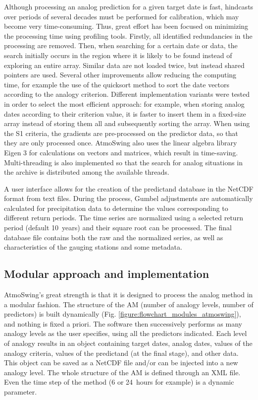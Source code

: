 \documentclass[gmd]{copernicus}
\begin{document}
Although processing an analog prediction for a given target date is fast, hindcasts over periods of several decades must be performed for calibration, which may become very time-consuming. Thus, great effort has been focused on minimizing the processing time using profiling tools. Firstly, all identified redundancies in the processing are removed. Then, when searching for a certain date or data, the search initially occurs in the region where it is likely to be found instead of exploring an entire array. Similar data are not loaded twice, but instead shared pointers are used. Several other improvements allow reducing the computing time, for example the use of the quicksort method \citep{Hoare1962a} to sort the date vectors according to the analogy criterion. Different implementation variants were tested in order to select the most efficient approach: for example, when storing analog dates according to their criterion value, it is faster to insert them in a fixed-size array instead of storing them all and subsequently sorting the array. When using the S1 criteria, the gradients are pre-processed on the predictor data, so that they are only processed once. AtmoSwing also uses the linear algebra library Eigen 3 \citep{Guennebaud2010} for calculations on vectors and matrices, which result in time-saving. Multi-threading is also implemented so that the search for analog situations in the archive is distributed among the available threads. 

A user interface allows for the creation of the predictand database in the NetCDF format from text files. During the process, Gumbel adjustments are automatically calculated for precipitation data to determine the values corresponding to different return periods. The time series are normalized using a selected return period (default 10~years) and their square root can be processed. The final database file contains both the raw and the normalized series, as well as characteristics of the gauging stations and some metadata.


\subsection{Modular approach and implementation}

AtmoSwing's great strength is that it is designed to process the analog method in a modular fashion. The structure of the AM (number of analogy levels, number of predictors) is built dynamically (Fig. \ref{figure:flowchart_modules_atmoswing}), and nothing is fixed a priori. The software then successively performs as many analogy levels as the user specifies, using all the predictors indicated. Each level of analogy results in an object containing target dates, analog dates, values of the analogy criteria, values of the predictand (at the final stage), and other data. This object can be saved as a NetCDF file and/or can be injected into a new analogy level. The whole structure of the AM is defined through an XML file. Even the time step of the method (6 or 24~hours for example) is a dynamic parameter.
\end{document}
